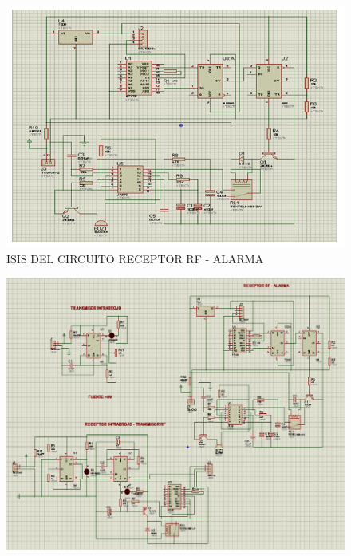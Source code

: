 \documentclass[a4paper,11pt]{article}
\begin{document}
%
	\begin{figure}[h]
		\caption{ISIS DEL CIRCUITO RECEPTOR RF - ALARMA}
		\centering
		\includegraphics[width=1\linewidth]{./17}
	\end{figure}
\newpage
	\begin{figure}[h]
		\centering
		\includegraphics[width=0.9\linewidth]{./18}
	\end{figure}
\newpage
\end{document}
